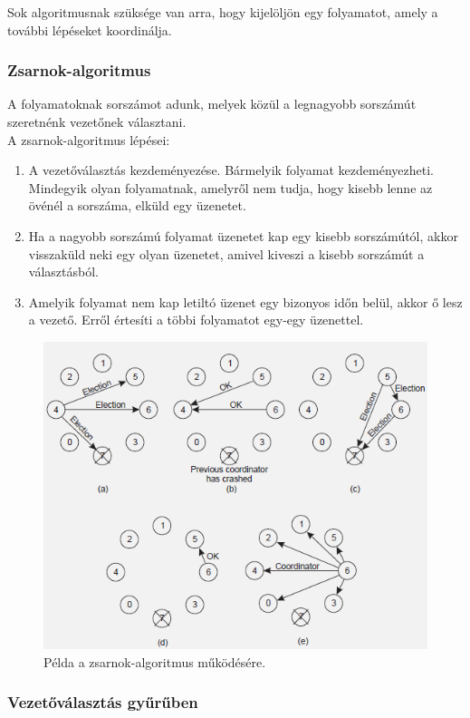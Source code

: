 \documentclass[margin=0px]{article}
\begin{document}
Sok algoritmusnak szüksége van arra, hogy kijelöljön egy folyamatot, amely a további lépéseket koordinálja.

\subsubsection{Zsarnok-algoritmus}

A folyamatoknak sorszámot adunk, melyek közül a legnagyobb sorszámút szeretnénk vezetőnek választani.\\

\noindent A zsarnok-algoritmus lépései:
\begin{enumerate}
    \item	A vezetőválasztás kezdeményezése. Bármelyik folyamat kezdeményezheti. Mindegyik olyan folyamatnak,
          amelyről nem tudja, hogy kisebb lenne az övénél a sorszáma, elküld egy üzenetet.

    \item	Ha a nagyobb sorszámú folyamat üzenetet kap egy kisebb sorszámútól, akkor visszaküld neki egy
          olyan üzenetet, amivel kiveszi a kisebb sorszámút a választásból.

    \item	Amelyik folyamat nem kap letiltó üzenet egy bizonyos időn belül, akkor ő lesz a vezető. Erről
          értesíti a többi folyamatot egy-egy üzenettel.
\end{enumerate}

\begin{figure}[H]
    \centering
    \includegraphics[width=0.6\linewidth]{img/zsarnok}
    \caption{Példa a zsarnok-algoritmus működésére.}
    \label{fig:zsarnok}
\end{figure}

\subsubsection{Vezetőválasztás gyűrűben}
\end{document}
